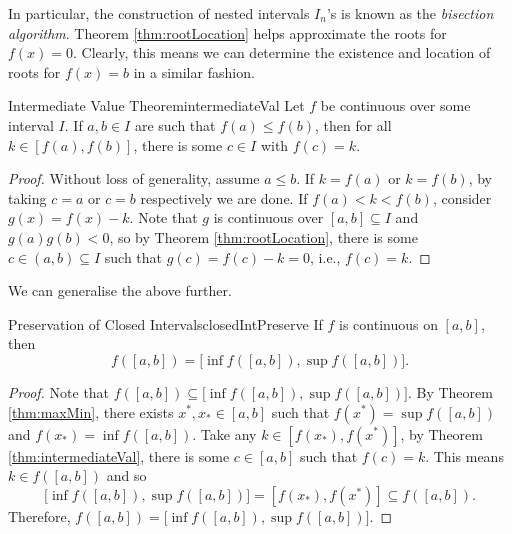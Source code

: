 \documentclass[math]{amznotes}
\theoremstyle{remark}
\begin{document}
In particular, the construction of nested intervals $I_n$'s is known as the \textit{bisection algorithm}. Theorem \ref{thm:rootLocation} helps approximate the roots for $f(x) = 0$. Clearly, this means we can determine the existence and location of roots for $f(x) = b$ in a similar fashion.
\begin{thmbox}{Intermediate Value Theorem}{intermediateVal}
    Let $f$ be continuous over some interval $I$. If $a, b \in I$ are such that $f(a) \leq f(b)$, then for all $k \in [f(a), f(b)]$, there is some $c \in I$ with $f(c) = k$.
    \tcblower
    \begin{proof}
        Without loss of generality, assume $a \leq b$. If $k = f(a)$ or $k = f(b)$, by taking $c = a$ or $c = b$ respectively we are done. If $f(a) < k < f(b)$, consider $g(x) = f(x) - k$. Note that $g$ is continuous over $[a, b] \subseteq I$ and $g(a)g(b) < 0$, so by Theorem \ref{thm:rootLocation}, there is some $c \in (a, b) \subseteq I$ such that $g(c) = f(c) - k = 0$, i.e., $f(c) = k$.
    \end{proof}
\end{thmbox}
We can generalise the above further.
\begin{thmbox}{Preservation of Closed Intervals}{closedIntPreserve}
    If $f$ is continuous on $[a, b]$, then 
    \begin{equation*}
        f([a, b]) = \bigl[\inf f([a, b]), \sup f([a, b])\bigr].
    \end{equation*}
    \tcblower
    \begin{proof}
        Note that $f([a, b]) \subseteq \bigl[\inf f([a, b]), \sup f([a, b])\bigr]$. By Theorem \ref{thm:maxMin}, there exists $x^*, x_* \in [a, b]$ such that $f(x^*) = \sup f([a, b])$ and $f(x_*) = \inf f([a, b])$. Take any $k \in [f(x_*), f(x^*)]$, by Theorem \ref{thm:intermediateVal}, there is some $c \in [a, b]$ such that $f(c) = k$. This means $k \in f([a, b])$ and so 
        \begin{equation*}
            \bigl[\inf f([a, b]), \sup f([a, b])\bigr] = [f(x_*), f(x^*)] \subseteq f([a, b]).
        \end{equation*}
        Therefore, $f([a, b]) = \bigl[\inf f([a, b]), \sup f([a, b])\bigr]$.
    \end{proof}
\end{thmbox}
\end{document}
